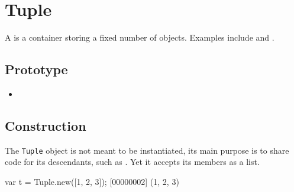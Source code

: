 \section{Tuple}

A  is a container storing a fixed number of objects.
Examples include  and .

\subsection{Prototype}
\begin{itemize}
\item {}
\end{itemize}

\subsection{Construction}

The \lstinline|Tuple| object is not meant to be instantiated, its main
purpose is to share code for its descendants, such as .
Yet it accepts its members as a list.

\begin{urbiscript}
var t = Tuple.new([1, 2, 3]);
[00000002] (1, 2, 3)
\end{urbiscript}

